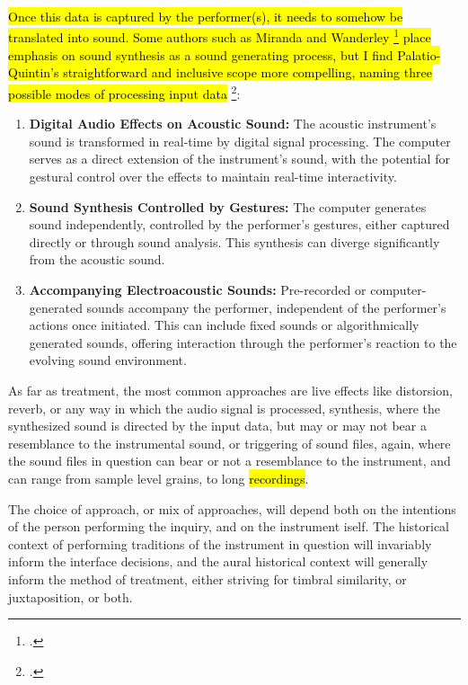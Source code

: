 \documentclass[12pt,twoside,maitrise]{dms_ks}
\theoremstyle{definition}
\begin{document}
{%

\hl{Once this data is captured by the performer(s), it needs to somehow be translated into sound. Some authors such as Miranda and Wanderley \footcite[3]{miranda_new_2006} place emphasis on sound synthesis as a sound generating process, but I find Palatio-Quintin's straightforward and inclusive scope more compelling, naming three possible modes of processing input data} \footcite[52]{palacio-quintin_composition_2012-1}:

{\begin{enumerate}
  \item \textbf{Digital Audio Effects on Acoustic Sound:} The acoustic instrument's sound is transformed in real-time by digital signal processing. 
The computer serves as a direct extension of the instrument's sound, with the potential for gestural control over the effects to maintain real-time interactivity.
  
  \item \textbf{Sound Synthesis Controlled by Gestures:} The computer generates sound independently, controlled by the performer's gestures, either captured directly or through sound analysis. 
This synthesis can diverge significantly from the acoustic sound.
  
  \item \textbf{Accompanying Electroacoustic Sounds:} Pre-recorded or computer-generated sounds accompany the performer, independent of the performer's actions once initiated. 
This can include fixed sounds or algorithmically generated sounds, offering interaction through the performer's reaction to the evolving sound environment.
\end{enumerate}


As far as treatment, the most common approaches are live effects like distorsion, reverb, or any way in which the audio signal is processed, synthesis, where the synthesized sound is directed by the input data, but may or may not bear a resemblance to the instrumental sound, or triggering of sound files, again, where the sound files in question can bear or not a resemblance to the instrument, and can range from sample level grains, to long \hl{recordings}.


The choice of approach, or mix of approaches, will depend both on the intentions of the person performing the inquiry, and on the instrument iself. The historical context of performing traditions of the instrument in question will invariably inform the interface decisions, and the aural historical context will generally inform the method of treatment, either striving for timbral similarity, or juxtaposition, or both.

}}
\end{document}
